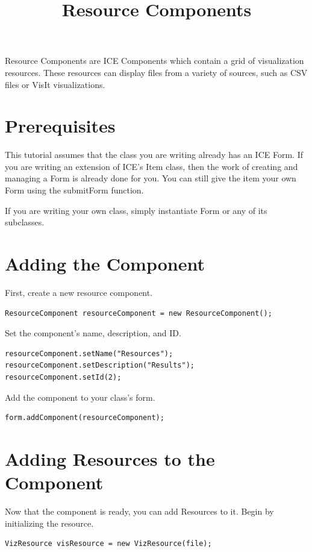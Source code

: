 \documentclass{article}
\begin{document}
\title{Resource Components}

Resource Components are ICE Components which contain a grid of visualization resources. These resources can display files from a variety of sources, such as CSV files or VisIt visualizations.

\section{Prerequisites}

This tutorial assumes that the class you are writing already has an ICE Form. If you are writing an extension of ICE's Item class, then the work of creating and managing a Form is already done for you. You can still give the item your own Form using the submitForm function.

If you are writing your own class, simply instantiate Form or any of its
subclasses.

\section{Adding the Component}

First, create a new resource component.

\begin{verbatim}
ResourceComponent resourceComponent = new ResourceComponent();
\end{verbatim}

Set the component's name, description, and ID.

\begin{verbatim}
resourceComponent.setName("Resources");
resourceComponent.setDescription("Results");
resourceComponent.setId(2);
\end{verbatim}

Add the component to your class's form.

\begin{verbatim}
form.addComponent(resourceComponent);
\end{verbatim}

\section{Adding Resources to the Component}

Now that the component is ready, you can add Resources to it. Begin by
initializing the resource.

\begin{verbatim}
VizResource visResource = new VizResource(file);
\end{verbatim}
\end{document}

